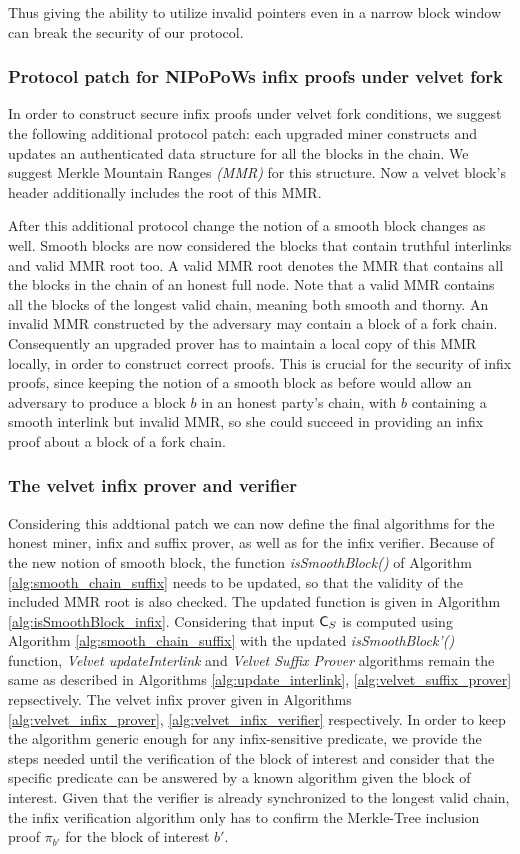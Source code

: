 Thus giving the ability to utilize invalid pointers even in a narrow block window can break the
security of our protocol. 

\subsubsection*{Protocol patch for NIPoPoWs infix proofs under velvet fork}
In order to construct secure infix proofs under velvet fork conditions, we suggest the following additional protocol patch: each upgraded miner constructs and updates an authenticated data structure for all the blocks in the chain. We suggest Merkle Mountain Ranges \emph{(MMR)} for this structure. Now a velvet block's header additionally includes the root of this MMR.

After this additional protocol change the notion of a smooth block changes as well. Smooth blocks are now considered the blocks that contain truthful interlinks and valid MMR root too. A valid MMR root denotes the MMR that contains all the blocks in the chain of an honest full node. Note that a valid MMR contains all the blocks of the longest valid chain, meaning both smooth and thorny. An invalid MMR constructed by the adversary may contain a block of a fork chain. Consequently an upgraded prover has to maintain a local copy of this MMR locally, in order to construct correct proofs. This is crucial for the security of infix proofs, since keeping the notion of a smooth block as before would allow an adversary to produce a block $b$ in an honest party's chain, with $b$ containing a smooth interlink but invalid MMR, so she could succeed in providing an infix proof about a block of a fork chain.

\subsubsection*{The velvet infix prover and verifier}
Considering this addtional patch we can now define the final algorithms for the honest miner, infix and suffix prover, as well as for the infix verifier. Because of the new notion of smooth block, the function \textit{isSmoothBlock()} of Algorithm \ref{alg:smooth_chain_suffix} needs to be updated, so that the validity of the included MMR root is also checked. The updated function is given in Algorithm \ref{alg:isSmoothBlock_infix}. Considering that input $\mathsf{C}_S$ is computed using Algorithm \ref{alg:smooth_chain_suffix} with the updated \textit{isSmoothBlock'()} function, \emph{Velvet updateInterlink} and \emph{Velvet Suffix Prover} algorithms remain the same as described in Algorithms \ref{alg:update_interlink}, \ref{alg:velvet_suffix_prover} repsectively. The velvet infix prover  given in Algorithms \ref{alg:velvet_infix_prover}, \ref{alg:velvet_infix_verifier} respectively.
In order to keep the algorithm generic enough for any infix-sensitive predicate, we provide the steps needed until the verification of the block of interest and consider that the specific predicate can be answered by a known algorithm given the block of interest. 
Given that the verifier is already synchronized to the longest valid chain, the infix verification algorithm only has to confirm
the Merkle-Tree inclusion proof $\pi_{b'}$ for the block of interest $b'$.


